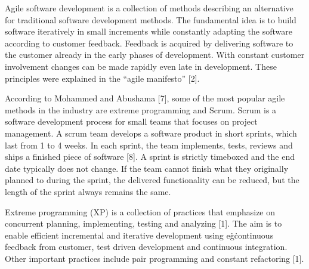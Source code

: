Agile software development is a collection of methods describing an
alternative for traditional software development methods. The fundamental
idea is to build software iteratively in small increments while
constantly adapting the software according to customer feedback.
Feedback is acquired by delivering software to the customer already in
the early phases of development. With constant customer involvement
changes can be made rapidly even late in development. These principles were
explained in the ``agile manifesto'' [2].

According to Mohammed and Abushama [7], some of the most popular agile
methods in the industry are extreme programming and Scrum. Scrum is a
software development process for small teams that focuses on project
management. A scrum team develops a software product in short sprints,
which last from 1 to 4 weeks. In each sprint, the team implements,
tests, reviews and ships a finished piece of software [8]. A sprint is
strictly timeboxed and the end date typically does not change. If the
team cannot finish what they originally planned to during the sprint,
the delivered functionality can be reduced, but the length of the sprint
always remains the same.

Extreme programming (XP) is a collection of practices that emphasize
on concurrent planning, implementing, testing and analyzing [1]. The
aim is to enable efficient incremental and iterative development
using e\.g\. continuous feedback from customer, test driven development
and continuous integration. Other important practices include pair
programming and constant refactoring [1].
